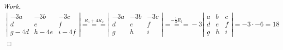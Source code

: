 \documentclass{article}
\begin{document}
\begin{proof}[Work]
    \begin{align*}
        \left\lvert\begin{array}{ccc}
                       -3a    & -3b    & -3c    \\
                       d      & e      & f      \\
                       g - 4d & h - 4e & i - 4f
                   \end{array} \right\rvert \overset{R_3 + 4R_2}{===}
        \left\lvert\begin{array}{ccc}
                       -3a & -3b & -3c \\
                       d   & e   & f   \\
                       g   & h   & i
                   \end{array} \right\rvert \overset{-\frac{1}{3}R_1}{===} -3
        \left\lvert\begin{array}{ccc}
                       a & b & c \\
                       d & e & f \\
                       g & h & i
                   \end{array} \right\rvert = -3 \cdot -6 = 18
    \end{align*}
\end{proof}
\qdash
\end{document}
